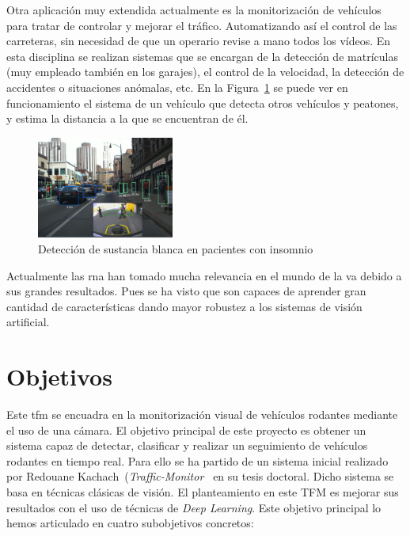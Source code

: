 Otra aplicación muy extendida actualmente es la monitorización de vehículos para tratar de controlar y mejorar el tráfico. Automatizando así el control de las carreteras, sin necesidad de que un operario revise a mano todos los vídeos. En esta disciplina se realizan sistemas que se encargan de la detección de matrículas (muy empleado también en los garajes), el control de la velocidad, la detección de accidentes o situaciones anómalas, etc. En la Figura~\ref{fig.deteccion_redes} se puede ver en funcionamiento el sistema de un vehículo que detecta otros vehículos y peatones, y estima la distancia a la que se encuentran de él.

\begin{figure}[H]
  \begin{center}
    \includegraphics[width=0.4\textwidth]{figures/Introduccion/deteccion_redes.png}
		\caption{Detección de sustancia blanca en pacientes con insomnio}
		\label{fig.deteccion_redes}
		\end{center}
\end{figure}

Actualmente las \acrshort{rna} han tomado mucha relevancia en el mundo de la \acrfull{va} debido a sus grandes resultados. Pues se ha visto que son capaces de aprender gran cantidad de características dando mayor robustez a los sistemas de visión artificial.


\section{Objetivos}

Este \acrfull{tfm} se encuadra en la monitorización visual de vehículos rodantes mediante el uso de una cámara. El objetivo principal de este proyecto es obtener un sistema capaz de detectar, clasificar y realizar un seguimiento de vehículos rodantes en tiempo real. Para ello se ha partido de un sistema inicial realizado por Redouane Kachach~\cite{redo_tesis}(\textit{Traffic-Monitor~\cite{traffic_monitor_redo}} en su tesis doctoral. Dicho sistema se basa en técnicas clásicas de visión. El planteamiento en este TFM es mejorar sus resultados con el uso de técnicas de \textit{Deep Learning}. Este objetivo principal lo hemos articulado en cuatro subobjetivos concretos:

